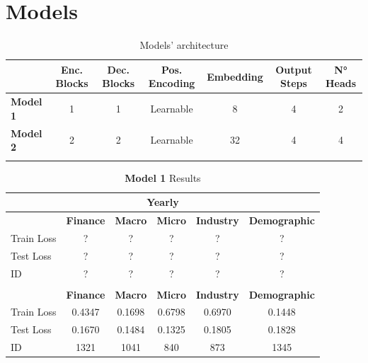 \documentclass{article}
\begin{document}
	
	\section*{Models}
	
	\begin{table}[h!]
		\centering
		\caption*{Models' architecture}
		\begin{tabular}{@{}lcccccc@{}}
			\midrule[0.2pt]
			& \textbf{Enc. Blocks} & \textbf{Dec. Blocks} & \textbf{Pos. Encoding} & \textbf{Embedding} & \textbf{Output Steps} & \textbf{N° Heads} \\
			\midrule[0.2pt]
			\textbf{Model 1} & 1 & 1 & Learnable & 8 & 4 & 2 \\
			\textbf{Model 2} & 2 & 2 & Learnable & 32 & 4 & 4 \\
			\addlinespace[16pt]
		\end{tabular}
	\end{table}
	
	\begin{table}[h!]
		\centering
		\caption*{\textbf{Model 1} Results}
		\begin{tabular}{@{}lccccc@{}}
			\multicolumn{6}{c}{\textbf{Yearly}} \\
			\midrule[0.2pt]
				& \textbf{Finance} & \textbf{Macro} & \textbf{Micro} & \textbf{Industry} & \textbf{Demographic} \\
			\midrule[0.2pt]
			Train Loss & ? & ? & ? & ? & ? \\
			Test Loss  & ? & ? & ? & ? & ? \\[4pt]
			ID         & ? & ? & ? & ? & ? \\
			\addlinespace[16pt]
			
			\multicolumn{6}{c}{\textbf{Quarterly}} \\
			\midrule[1pt]
			& \textbf{Finance} & \textbf{Macro} & \textbf{Micro} & \textbf{Industry} & \textbf{Demographic} \\
			\midrule[0.2pt]
			Train Loss & 0.4347 & 0.1698 & 0.6798 & 0.6970 & 0.1448 \\
			Test Loss  & 0.1670 & 0.1484 & 0.1325 & 0.1805 & 0.1828 \\[4pt]
			ID         & 1321 & 1041 & 840 & 873 & 1345 \\
		\end{tabular}
	\end{table}
	
\end{document}
